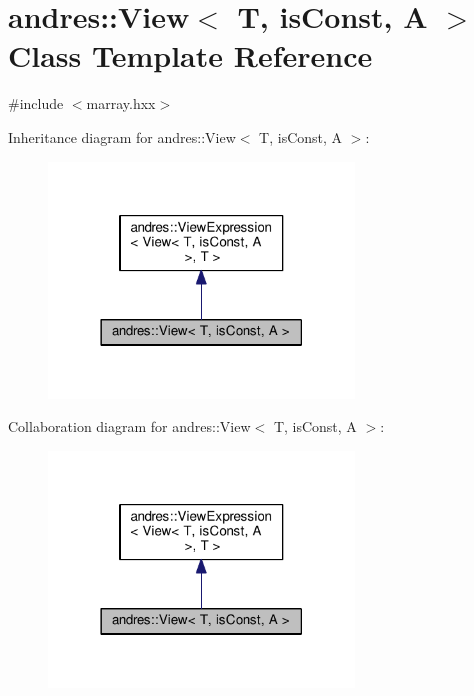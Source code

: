 \hypertarget{classandres_1_1View}{}\section{andres\+:\+:View$<$ T, is\+Const, A $>$ Class Template Reference}
\label{classandres_1_1View}


{\ttfamily \#include $<$marray.\+hxx$>$}



Inheritance diagram for andres\+:\+:View$<$ T, is\+Const, A $>$\+:\nopagebreak
\begin{figure}[H]
\begin{center}
\leavevmode
\includegraphics[width=230pt]{classandres_1_1View__inherit__graph}
\end{center}
\end{figure}


Collaboration diagram for andres\+:\+:View$<$ T, is\+Const, A $>$\+:\nopagebreak
\begin{figure}[H]
\begin{center}
\leavevmode
\includegraphics[width=230pt]{classandres_1_1View__coll__graph}
\end{center}
\end{figure}
